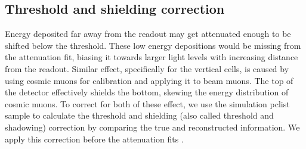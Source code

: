 

\subsection{Threshold and shielding correction}

Energy deposited far away from the readout may get attenuated enough to be shifted below the threshold. These low energy depositions would be missing from the attenuation fit, biasing it towards larger light levels with increasing distance from the readout. Similar effect, specifically for the vertical cells, is caused by using cosmic muons for calibration and applying it to beam muons. The top of the detector effectively shields the bottom, skewing the energy distribution of cosmic muons. To correct for both of these effect, we use the simulation pclist sample to calculate the threshold and shielding (also called threshold and shadowing) correction by comparing the true and reconstructed information. We apply this correction before the attenuation fits \cite{NOVA-doc-13579-SAAttenuationAndThreshold}.


